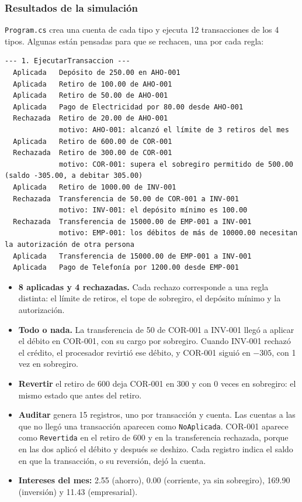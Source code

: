 \subsubsection{Resultados de la simulación}

\texttt{Program.cs} crea una cuenta de cada tipo y ejecuta 12 transacciones de los 4 tipos.
Algunas están pensadas para que se rechacen, una por cada regla:

\begin{lstlisting}[language={}, numbers=none, basicstyle=\ttfamily\scriptsize, columns=fullflexible, keepspaces=true]
--- 1. EjecutarTransaccion ---
  Aplicada   Depósito de 250.00 en AHO-001
  Aplicada   Retiro de 100.00 de AHO-001
  Aplicada   Retiro de 50.00 de AHO-001
  Aplicada   Pago de Electricidad por 80.00 desde AHO-001
  Rechazada  Retiro de 20.00 de AHO-001
             motivo: AHO-001: alcanzó el límite de 3 retiros del mes
  Aplicada   Retiro de 600.00 de COR-001
  Rechazada  Retiro de 300.00 de COR-001
             motivo: COR-001: supera el sobregiro permitido de 500.00 (saldo -305.00, a debitar 305.00)
  Aplicada   Retiro de 1000.00 de INV-001
  Rechazada  Transferencia de 50.00 de COR-001 a INV-001
             motivo: INV-001: el depósito mínimo es 100.00
  Rechazada  Transferencia de 15000.00 de EMP-001 a INV-001
             motivo: EMP-001: los débitos de más de 10000.00 necesitan la autorización de otra persona
  Aplicada   Transferencia de 15000.00 de EMP-001 a INV-001
  Aplicada   Pago de Telefonía por 1200.00 desde EMP-001
\end{lstlisting}

\begin{itemize}
  \item \textbf{8 aplicadas y 4 rechazadas.} Cada rechazo corresponde a una regla distinta:
        el límite de retiros, el tope de sobregiro, el depósito mínimo y la autorización.
  \item \textbf{Todo o nada.} La transferencia de 50 de COR-001 a INV-001 llegó a aplicar el
        débito en COR-001, con su cargo por sobregiro. Cuando INV-001 rechazó el crédito, el
        procesador revirtió ese débito, y COR-001 siguió en $-305$, con 1 vez en sobregiro.
  \item \textbf{Revertir} el retiro de 600 deja COR-001 en 300 y con 0 veces en sobregiro: el
        mismo estado que antes del retiro.
  \item \textbf{Auditar} genera 15 registros, uno por transacción y cuenta. Las cuentas a las
        que no llegó una transacción aparecen como \texttt{NoAplicada}. COR-001 aparece como
        \texttt{Revertida} en el retiro de 600 y en la transferencia rechazada, porque en las
        dos aplicó el débito y después se deshizo. Cada registro indica el saldo en que la
        transacción, o su reversión, dejó la cuenta.
  \item \textbf{Intereses del mes:} 2.55 (ahorro), 0.00 (corriente, ya sin sobregiro), 169.90
        (inversión) y 11.43 (empresarial).
\end{itemize}

